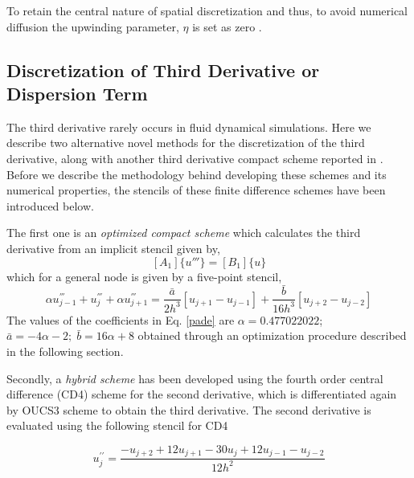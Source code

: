  To retain the central nature of spatial discretization and thus, to avoid numerical diffusion the upwinding parameter, $\eta$ is set as zero \cite{Sengupta2013a,Sengupta2006b}.
\subsection{Discretization of Third Derivative or Dispersion Term}
The third derivative rarely occurs in fluid dynamical simulations. Here we describe two alternative novel methods for the discretization of the third derivative, along with another third derivative compact scheme reported in \cite{Li2006}. Before we describe the methodology behind developing these schemes and its numerical properties, the stencils of these finite difference schemes have been introduced below.

The first one is an \textit{optimized compact scheme} which calculates the third derivative from an implicit stencil given by,
\begin{equation*}
\label{matrix}
[A_1]\{u'''\} = [B_1]\{u\}
\end{equation*}
which for a general node is given by a five-point stencil,
\begin{equation}
\label{pade}
\alpha u_{j-1}^{'''} +  u_{j}^{'''} + \alpha u_{j+1}^{'''} 
= \frac{\bar{a}}{2h^3}\left[u_{j+1}-u_{j-1}\right] + \frac{\bar{b}}{16h^3}\left[u_{j+2}-u_{j-2}\right]
\end{equation}
The values of the coefficients in Eq. \eqref{pade} are $\alpha=0.477022022$; $ \bar{a}= -4\alpha-2;\; \bar{b}=16\alpha +8$ obtained through an optimization procedure described in the following section. 

Secondly, a \textit{hybrid scheme} has been developed using the fourth order central difference (CD4) scheme for the second derivative, which is differentiated again by OUCS3 scheme to obtain the third derivative. The second derivative is evaluated using the following stencil for CD4

\begin{equation}
\label{eq:cd4}
u_{j}^{\prime\prime}=\frac{-u_{j+2}+12u_{j+1}-30u_{j}+12u_{j-1}-u_{j-2}}{12h^{2}}
\end{equation}

